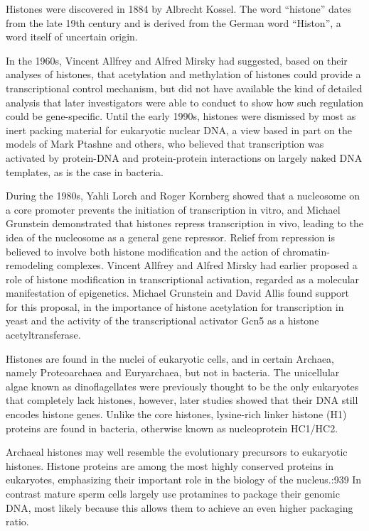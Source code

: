 Histones were discovered in 1884 by Albrecht Kossel. The word ``histone'' dates from the late 19th century and is derived from the German word ``Histon'', a word itself of uncertain origin.

In the 1960s, Vincent Allfrey and Alfred Mirsky had suggested, based on their analyses of histones, that acetylation and methylation of histones could provide a transcriptional control mechanism, but did not have available the kind of detailed analysis that later investigators were able to conduct to show how such regulation could be gene-specific. Until the early 1990s, histones were dismissed by most as inert packing material for eukaryotic nuclear DNA, a view based in part on the models of Mark Ptashne and others, who believed that transcription was activated by protein-DNA and protein-protein interactions on largely naked DNA templates, as is the case in bacteria.

During the 1980s, Yahli Lorch and Roger Kornberg showed that a nucleosome on a core promoter prevents the initiation of transcription in vitro, and Michael Grunstein demonstrated that histones repress transcription in vivo, leading to the idea of the nucleosome as a general gene repressor. Relief from repression is believed to involve both histone modification and the action of chromatin-remodeling complexes. Vincent Allfrey and Alfred Mirsky had earlier proposed a role of histone modification in transcriptional activation, regarded as a molecular manifestation of epigenetics. Michael Grunstein and David Allis found support for this proposal, in the importance of histone acetylation for transcription in yeast and the activity of the transcriptional activator Gcn5 as a histone acetyltransferase.

Histones are found in the nuclei of eukaryotic cells, and in certain Archaea, namely Proteoarchaea and Euryarchaea, but not in bacteria. The unicellular algae known as dinoflagellates were previously thought to be the only eukaryotes that completely lack histones, however, later studies showed that their DNA still encodes histone genes. Unlike the core histones, lysine-rich linker histone (H1) proteins are found in bacteria, otherwise known as nucleoprotein HC1/HC2.

Archaeal histones may well resemble the evolutionary precursors to eukaryotic histones. Histone proteins are among the most highly conserved proteins in eukaryotes, emphasizing their important role in the biology of the nucleus.:939 In contrast mature sperm cells largely use protamines to package their genomic DNA, most likely because this allows them to achieve an even higher packaging ratio.

